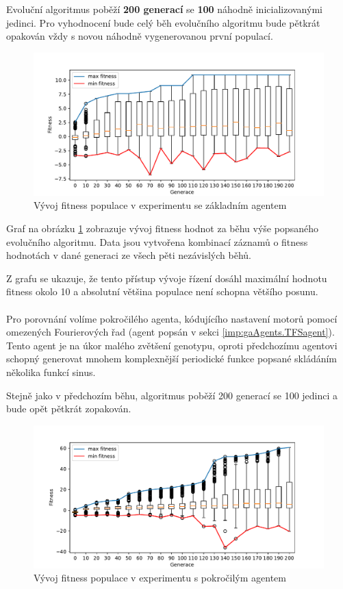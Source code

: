 Evoluční algoritmus poběží \textbf{200 generací} se \textbf{100} náhodně
inicializovanými jedinci. Pro vyhodnocení bude celý běh evolučního algoritmu
bude pětkrát opakován vždy s novou náhodně vygenerovanou první populací.

\begin{figure}[!h]
    \centering
    \includegraphics[width=1\textwidth]{../img/experiment1_Sine_10ticks.pdf}
    \caption{Vývoj fitness populace v experimentu se základním agentem}
    \label{exp:first_sinefull}
\end{figure}

Graf na obrázku \ref{exp:first_sinefull} zobrazuje vývoj fitness
hodnot za běhu výše popsaného evolučního algoritmu. Data jsou vytvořena
kombinací záznamů o fitness hodnotách v dané generaci ze všech pěti nezávislých
běhů.

Z grafu se ukazuje, že tento přístup vývoje řízení dosáhl maximální hodnotu
fitness okolo 10 a absolutní většina populace není schopna většího posunu. 

\paragraph{}
Pro porovnání volíme pokročilého agenta, kódujícího nastavení motorů pomocí
omezených Fourierových řad (agent popsán v sekci \ref{imp:gaAgents.TFSagent}).
Tento agent je na úkor malého zvětšení genotypu, oproti předchozímu agentovi
schopný generovat mnohem komplexnější periodické funkce popsané skládáním
několika funkcí sinus.

Stejně jako v předchozím běhu, algoritmus poběží 200 generací se 100 jedinci a
bude opět pětkrát zopakován.

\begin{figure}[!h]
    \centering
    \includegraphics[width=1\textwidth]{../img/experiment1_TFS_10ticks.pdf}
    \caption{Vývoj fitness populace v experimentu s pokročilým agentem}
    \label{exp:first_TFS}
\end{figure}

